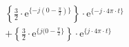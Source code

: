 \correct
\[
\begin{split}
&  \left \{ \frac{3}{2} \cdot \textrm{e}^{\{-j (0-\frac{\pi}{2}) \}} \right \} \cdot \textrm{e}^{\{-j \cdot 4\pi \cdot t \}} \\
&+ \left \{ \frac{3}{2} \cdot \textrm{e}^{\{j (0-\frac{\pi}{2} \}} \right \} \cdot \textrm{e}^{\{j \cdot 4\pi \cdot t \}}
\end{split}
\]
